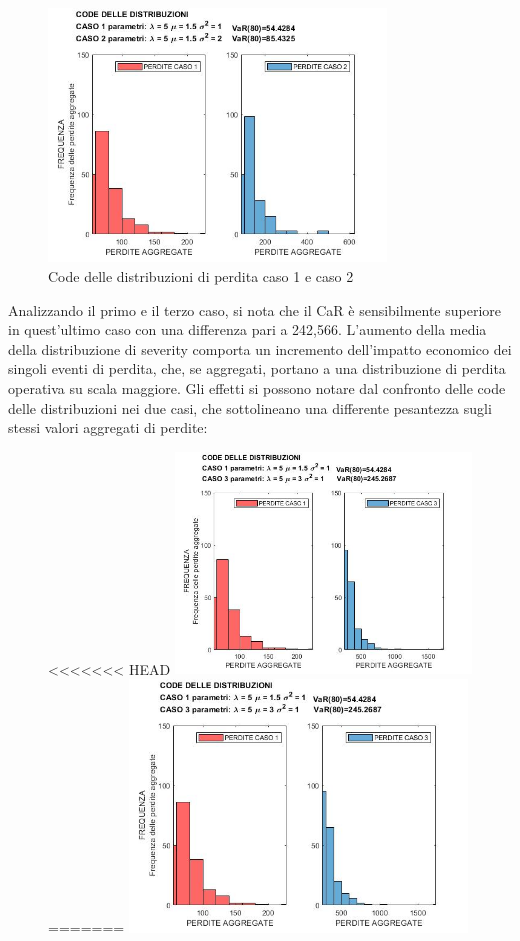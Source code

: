 \documentclass[titlepage]{article}
\begin{document}
\begin{itemize}
{\begin{figure}[htbp]
	\centering
	\includegraphics[width=0.8\textwidth]{CODE 1VS2.jpg}
	\caption{\label{fig:CODE 1VS2.jpg}Code delle distribuzioni di perdita caso 1 e caso 2}
\end{figure}
	Analizzando il primo e il terzo caso, si nota che il CaR è sensibilmente superiore in quest’ultimo caso con una differenza pari a 242,566. L’aumento della media della distribuzione di severity comporta un incremento dell’impatto economico dei singoli eventi di perdita, che, se aggregati, portano a una distribuzione di perdita operativa su scala maggiore. Gli effetti si possono notare dal confronto delle code delle distribuzioni nei due casi, che sottolineano una differente pesantezza sugli stessi valori aggregati di perdite:
\begin{figure}[htbp]
	\centering
<<<<<<< HEAD
	\includegraphics[width=0.7\textwidth]{CODE1VS3.jpg}
=======
	\includegraphics[width=0.8\textwidth]{CODE1VS3.jpg}

\end{figure}}
\end{itemize}
\end{document}
